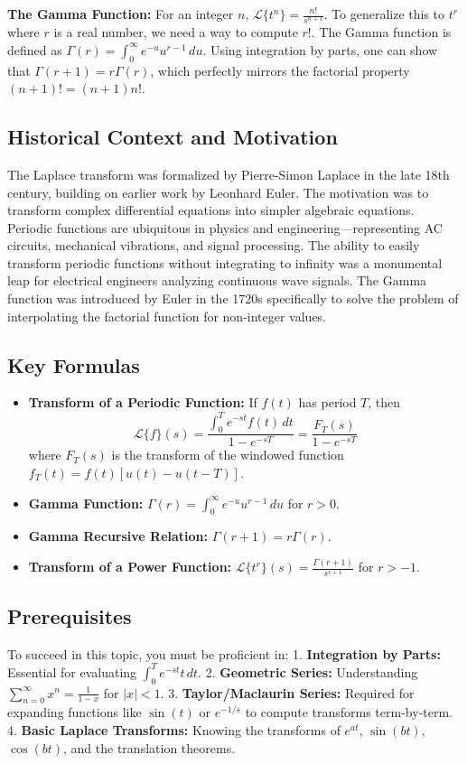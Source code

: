 \documentclass[11pt, letterpaper]{article}
\theoremstyle{definition}
\theoremstyle{remark}
\begin{document}
\textbf{The Gamma Function:}
For an integer $n$, $\mathcal{L}\{t^n\} = \frac{n!}{s^{n+1}}$. To generalize this to $t^r$ where $r$ is a real number, we need a way to compute $r!$. The Gamma function is defined as $\Gamma(r) = \int_0^\infty e^{-u} u^{r-1} \, du$. Using integration by parts, one can show that $\Gamma(r+1) = r\Gamma(r)$, which perfectly mirrors the factorial property $(n+1)! = (n+1)n!$.

\subsection{Historical Context and Motivation}
The Laplace transform was formalized by Pierre-Simon Laplace in the late 18th century, building on earlier work by Leonhard Euler. The motivation was to transform complex differential equations into simpler algebraic equations. Periodic functions are ubiquitous in physics and engineering—representing AC circuits, mechanical vibrations, and signal processing. The ability to easily transform periodic functions without integrating to infinity was a monumental leap for electrical engineers analyzing continuous wave signals. The Gamma function was introduced by Euler in the 1720s specifically to solve the problem of interpolating the factorial function for non-integer values.

\subsection{Key Formulas}
\begin{itemize}
    \item \textbf{Transform of a Periodic Function:} If $f(t)$ has period $T$, then
    \[ \mathcal{L}\{f\}(s) = \frac{\int_0^T e^{-st} f(t) \, dt}{1 - e^{-sT}} = \frac{F_T(s)}{1 - e^{-sT}} \]
    where $F_T(s)$ is the transform of the windowed function $f_T(t) = f(t)[u(t) - u(t-T)]$.
    \item \textbf{Gamma Function:} $\Gamma(r) = \int_0^\infty e^{-u} u^{r-1} \, du$ for $r > 0$.
    \item \textbf{Gamma Recursive Relation:} $\Gamma(r+1) = r\Gamma(r)$.
    \item \textbf{Transform of a Power Function:} $\mathcal{L}\{t^r\}(s) = \frac{\Gamma(r+1)}{s^{r+1}}$ for $r > -1$.
\end{itemize}

\subsection{Prerequisites}
To succeed in this topic, you must be proficient in:
1. \textbf{Integration by Parts:} Essential for evaluating $\int_0^T e^{-st} t \, dt$.
2. \textbf{Geometric Series:} Understanding $\sum_{n=0}^\infty x^n = \frac{1}{1-x}$ for $|x| < 1$.
3. \textbf{Taylor/Maclaurin Series:} Required for expanding functions like $\sin(t)$ or $e^{-1/s}$ to compute transforms term-by-term.
4. \textbf{Basic Laplace Transforms:} Knowing the transforms of $e^{at}$, $\sin(bt)$, $\cos(bt)$, and the translation theorems.
\end{document}
